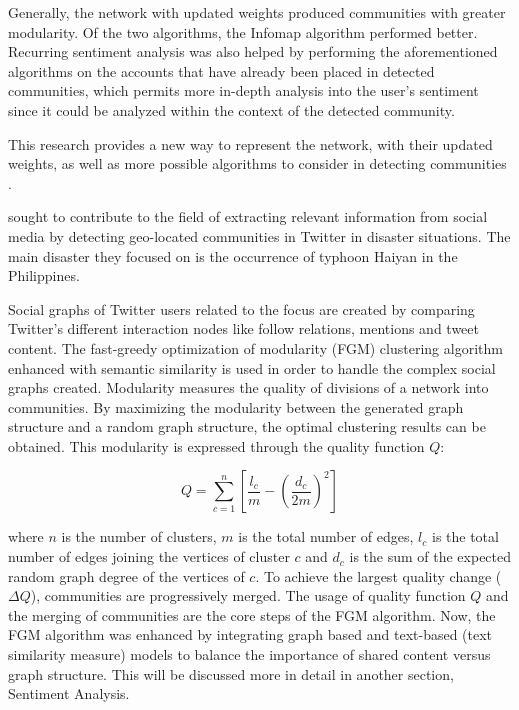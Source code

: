 Generally, the network with updated weights produced communities with greater modularity. Of the two algorithms, the Infomap algorithm performed better. Recurring sentiment analysis was also helped by performing the aforementioned algorithms on the accounts that have already been placed in detected communities, which permits more in-depth analysis into the user’s sentiment since it could be analyzed within the context of the detected community.

This research provides a new way to represent the network, with their updated weights, as well as more possible algorithms to consider in detecting communities \cite{Deitrick:2013}.

 sought to contribute to the field of extracting relevant information from social media by detecting geo-located communities in Twitter in disaster situations. The main disaster they focused on is the occurrence of typhoon Haiyan in the Philippines. 

Social graphs of Twitter users related to the focus are created by comparing Twitter's different interaction nodes like follow relations, mentions and tweet content. The fast-greedy optimization of modularity (FGM) clustering algorithm enhanced with semantic similarity is used in order to handle the complex social graphs created. Modularity measures the quality of divisions of a network into communities. By maximizing the modularity between the generated graph structure and a random graph structure, the optimal clustering results can be obtained. This modularity is expressed through the quality function $Q$:

\begin{equation}
Q = \sum_{c = 1}^{n} \left [ \frac{l_c}{m} - \left (\frac{d_c}{2m} \right )^2 \right ]
\end{equation}

where $n$ is the number of clusters, $m$ is the total number of edges, $l_c$ is the total number of edges joining the vertices of cluster $c$ and $d_c$ is the sum of the expected random graph degree of the vertices of $c$. To achieve the largest quality change ($\Delta$$Q$), communities are progressively merged. The usage of quality function $Q$ and the merging of communities are the core steps of the FGM algorithm. Now, the FGM algorithm was enhanced by integrating graph based and text-based (text similarity measure) models to balance the importance of shared content versus graph structure. This will be discussed more in detail in another section, Sentiment Analysis.


